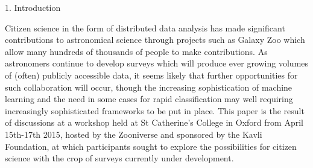 1. Introduction

Citizen science in the form of distributed data analysis has made significant contributions to astronomical science through projects such as Galaxy Zoo which allow many hundreds of thousands of people to make contributions. As astronomers continue to develop surveys which will produce ever growing volumes of (often) publicly accessible data, it seems likely that further opportunities for such collaboration will occur, though the increasing sophistication of machine learning and the need in some cases for rapid classification may well requiring increasingly sophisticated frameworks to be put in place. This paper is the result of discussions at a workshop held at St Catherine's College in Oxford from April 15th-17th 2015, hosted by the Zooniverse and sponsored by the Kavli Foundation, at which participants sought to explore the possibilities for citizen science with the crop of surveys currently under development. 